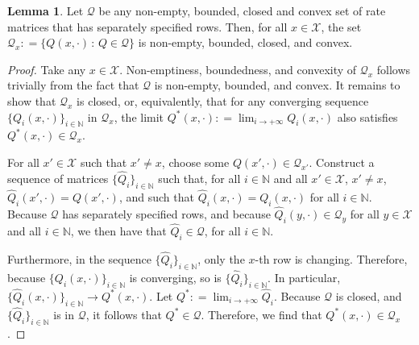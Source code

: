 \documentclass[10pt]{paper}
\theoremstyle{definition}
\newtheorem{lemma}[theorem]{Lemma}
\newcommand{\nats}{\mathbb{N}}
\newcommand{\states}{\mathcal{X}}
\newcommand{\rateset}{\mathcal{Q}}
\newcommand{\coloneqq}{:\!=}
\begin{document}
\begin{lemma}\label{lemma:rows_nonempty_bounded_closed_convex}
Let $\rateset$ be any non-empty, bounded, closed and convex set of rate matrices that has separately specified rows. Then, for all $x\in\states$, the set $\rateset_x\coloneqq\{Q(x,\cdot)\,:\,Q\in\rateset\}$ is non-empty, bounded, closed, and convex.
\end{lemma}
\begin{proof}
Take any $x\in\states$. Non-emptiness, boundedness, and convexity of $\rateset_x$ follows trivially from the fact that $\rateset$ is non-empty, bounded, and convex. It remains to show that $\rateset_x$ is closed, or, equivalently, that for any converging sequence $\{Q_i(x,\cdot)\}_{i\in\nats}$ in $\rateset_x$, the limit $Q^*(x,\cdot)\coloneqq\lim_{i\to+\infty}Q_i(x,\cdot)$ also satisfies $Q^*(x,\cdot)\in\rateset_x$.

For all $x'\in\states$ such that $x'\neq x$, choose some $Q(x',\cdot)\in\rateset_{x'}$. Construct a sequence of matrices $\{\hat{Q}_i\}_{i\in\nats}$ such that, for all $i\in\nats$ and all $x'\in\states$, $x'\neq x$, $\hat{Q}_i(x',\cdot)=Q(x',\cdot)$, and such that $\hat{Q}_i(x,\cdot)=Q_i(x,\cdot)$ for all $i\in\nats$. Because $\rateset$ has separately specified rows, and because $\hat{Q}_i(y,\cdot)\in\rateset_y$ for all $y\in\states$ and all $i\in\nats$, we then have that $\hat{Q}_i\in\rateset$, for all $i\in\nats$.

Furthermore, in the sequence $\{\hat{Q}_i\}_{i\in\nats}$, only the $x$-th row is changing. Therefore, because $\{Q_i(x,\cdot)\}_{i\in\nats}$ is converging, so is $\{\hat{Q}_i\}_{i\in\nats}$. In particular, $\{\hat{Q}_i(x,\cdot)\}_{i\in\nats}\to Q^*(x,\cdot)$. Let $Q^*\coloneqq\lim_{i\to+\infty}\hat{Q}_i$. Because $\rateset$ is closed, and $\{\hat{Q}_i\}_{i\in\nats}$ is in $\rateset$, it follows that $Q^*\in\rateset$. Therefore, we find that $Q^*(x,\cdot)\in\rateset_x$.
\end{proof}
\end{document}
